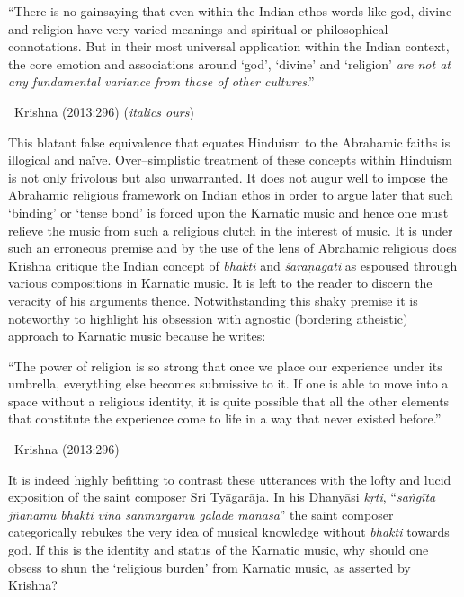 \begin{myquote}
“There is no gainsaying that even within the Indian ethos words like god, divine and religion have very varied meanings and spiritual or philosophical connotations. But in their most universal application within the Indian context, the core emotion and associations around ‘god’, ‘divine’ and ‘religion’ \textit{are not at any fundamental variance from those of other cultures}.” 

~\hfill Krishna (2013:296) (\textit{italics ours})
\end{myquote}

This blatant false equivalence that equates Hinduism to the Abrahamic faiths is illogical and naïve. Over–simplistic treatment of these concepts within Hinduism is not only frivolous but also unwarranted. It does not augur well to impose the Abrahamic religious framework on Indian ethos in order to argue later that such ‘binding’ or ‘tense bond’ is forced upon the Karnatic music and hence one must relieve the music from such a religious clutch in the interest of music. It is under such an erroneous premise and by the use of the lens of Abrahamic religious does Krishna critique the Indian concept of \textit{bhakti} and \textit{śaraṇāgati }as espoused through various compositions in Karnatic music. It is left to the reader to discern the veracity of his arguments thence. Notwithstanding this shaky premise it is noteworthy to highlight his obsession with agnostic (bordering atheistic) approach to Karnatic music because he writes:

\begin{myquote}
“The power of religion is so strong that once we place our experience under its umbrella, everything else becomes submissive to it. If one is able to move into a space without a religious identity, it is quite possible that all the other elements that constitute the experience come to life in a way that never existed before.” 

~\hfill Krishna (2013:296)
\end{myquote}

It is indeed highly befitting to contrast these utterances with the lofty and lucid exposition of the saint composer Sri Tyāgarāja. In his Dhanyāsi\textit{ kṛti}, “\textit{saṅgīta jñānamu bhakti vinā sanmārgamu galade manasā}” the saint composer categorically rebukes the very idea of musical knowledge without \textit{bhakti} towards god. If this is the identity and status of the Karnatic music, why should one obsess to shun the ‘religious burden’ from Karnatic music, as asserted by Krishna?

